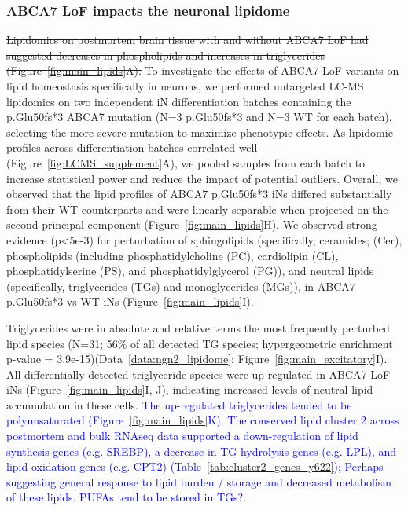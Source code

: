 \subsubsection{ABCA7 LoF impacts the neuronal lipidome}
\sout{Lipidomics on postmortem brain tissue with and without ABCA7 LoF had suggested decreases in phospholipids and increases in triglycerides (Figure~\ref{fig:main_lipids}A).} To investigate the effects of ABCA7 LoF variants on lipid homeostasis specifically in neurons, we performed untargeted LC-MS lipidomics on two independent iN differentiation batches containing the p.Glu50fs*3 ABCA7 mutation (N=3 p.Glu50fs*3 and N=3 WT for each batch), selecting the more severe mutation to maximize phenotypic effects. As lipidomic profiles across differentiation batches correlated well (Figure~\ref{fig:LCMS_supplement}A), we pooled samples from each batch to increase statistical power and reduce the impact of potential outliers. Overall, we observed that the lipid profiles of ABCA7 p.Glu50fs*3 iNs differed substantially from their WT counterparts and were linearly separable when projected on the second principal component (Figure~\ref{fig:main_lipids}H). We observed strong evidence (p<5e-3) for perturbation of sphingolipids (specifically, ceramides; (Cer), phospholipids (including phosphatidylcholine (PC), cardiolipin (CL), phosphatidylserine (PS), and phosphatidylglycerol (PG)), and neutral lipids (specifically, triglycerides (TGs) and monoglycerides (MGs)), in ABCA7 p.Glu50fs*3 vs WT iNs (Figure~\ref{fig:main_lipids}I). 

Triglycerides were in absolute and relative terms the most frequently perturbed lipid species (N=31; 56\% of all detected TG species; hypergeometric enrichment p-value = 3.9e-15)(Data~\ref{data:ngn2_lipidome}; Figure~\ref{fig:main_excitatory}I). All differentially detected triglyceride species were up-regulated in ABCA7 LoF iNs (Figure~\ref{fig:main_lipids}I, J), indicating increased levels of neutral lipid accumulation in these cells. \textcolor{blue}{The up-regulated triglycerides tended to be polyunsaturated (Figure~\ref{fig:main_lipids}K). The conserved lipid cluster 2 across postmortem and bulk RNAseq data supported a down-regulation of lipid synthesis genes (e.g. SREBP), a decrease in TG hydrolysis genes (e.g. LPL), and lipid oxidation genes (e.g. CPT2) (Table~\ref{tab:cluster2_genes_y622}); Perhaps suggesting general response to lipid burden / storage and decreased metabolism of these lipids. PUFAs tend to be stored in TGs?}.

